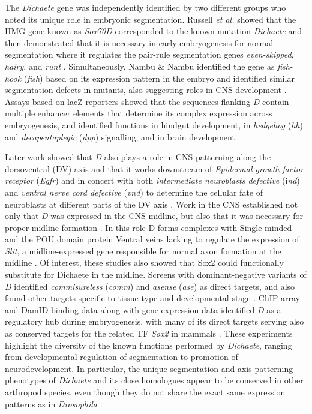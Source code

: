 \documentclass[withindex,glossary]{cam-thesis}
\begin{document}
The \emph{Dichaete} gene was independently identified by two different
groups who noted its unique role in embryonic segmentation. Russell
\emph{et al.} showed that the HMG gene known as \emph{Sox70D}
corresponded to the known mutation \emph{Dichaete} and then demonstrated
that it is necessary in early embryogenesis for normal segmentation
where it regulates the pair-rule segmentation genes \emph{even-skipped},
\emph{hairy}, and \emph{runt} . Simultaneously,
Nambu \& Nambu identified the gene as \emph{fish-hook} (\emph{fish})
based on its expression pattern in the embryo and identified similar
segmentation defects in mutants, also suggesting roles in CNS
development . Assays based on lacZ reporters
showed that the sequences flanking \emph{D} contain multiple enhancer
elements that determine its complex expression across embryogenesis, and
identified functions in hindgut development, in \emph{hedgehog}
(\emph{hh}) and \emph{decapentaplegic} (\emph{dpp}) signalling, and in
brain development .

Later work showed that \emph{D} also plays a role in CNS patterning
along the dorsoventral (\gls{DV}) axis and that it works downstream of
\emph{Epidermal growth factor receptor} (\emph{Egfr}) and in concert
with both \emph{intermediate neuroblasts defective} (i\emph{nd}) and
\emph{ventral nerve cord defective} (\emph{vnd}) to determine the
cellular fate of neuroblasts at different parts of the DV axis . Work in the CNS established not only that \emph{D} was
expressed in the CNS midline, but also that it was necessary for proper
midline formation . In this role D forms
complexes with Single minded and the POU domain protein Ventral veins
lacking to regulate the expression of \emph{Slit}, a midline-expressed
gene responsible for normal axon formation at the midline . Of interest, these studies also showed that Sox2 could
functionally substitute for Dichaete in the midline. Screens with
dominant-negative variants of \emph{D} identified \emph{commisureless}
(\emph{comm}) and \emph{asense} (\emph{ase}) as direct targets, and also
found other targets specific to tissue type and developmental stage
. ChIP-array and \gls{DamID} binding data along with gene
expression data identified \emph{D} as a regulatory hub during
embryogenesis, with many of its direct targets serving also as conserved
targets for the related TF \emph{Sox2} in mammals . These experiments highlight the diversity of the known functions
performed by \emph{Dichaete}, ranging from developmental regulation of
segmentation to promotion of neurodevelopment. In particular, the unique
segmentation and axis patterning phenotypes of \emph{Dichaete} and its
close homologues appear to be conserved in other arthropod species, even
though they do not share the exact same expression patterns as in
\emph{Drosophila} .
\end{document}
